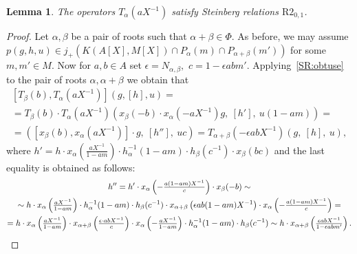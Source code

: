 \documentclass[oneside, 8pt]{amsart}
\newtheorem{lemma}{Lemma}
\theoremstyle{remark}
\theoremstyle{definition}
\numberwithin{lemma}{section}
\numberwithin{prop}{section}
\numberwithin{corollary}{section}
\numberwithin{externaltheorem}{section}
\numberwithin{equation}{section}
\begin{document}
\begin{lemma} \label{R2_0_1} The operators $T_\alpha(aX^{-1})$ satisfy Steinberg relations $\mathrm{R2}_{0,1}$. \end{lemma}
\begin{proof} 
Let $\alpha, \beta$ be a pair of roots such that $\alpha + \beta \in \Phi$.
As before, we may assume $p(g, h, u) \in j_+(K(A[X], M[X]) \cap P_\alpha(m) \cap P_{\alpha + \beta}(m'))$ for some $m, m' \in M$.
Now for $a, b \in A$ set $\epsilon = N_{\alpha, \beta},$ $c = 1 - \epsilon abm'$.
Applying~\cref{SR:obtuse} to the pair of roots $\alpha, \alpha+\beta$ we obtain that 
\begin{multline} \nonumber
[T_\beta(b), T_\alpha(aX^{-1})] \left(g, [h], u \right) = \\
 = T_\beta(b) \cdot T_\alpha(aX^{-1}) \left(x_\beta(-b) \cdot x_\alpha (-a X^{-1}) g,\ [h'],\ u (1 - am) \right) = \\
 = \left([x_\beta(b), x_\alpha(aX^{-1})]\cdot g,\ [h''],\ u c\right) = T_{\alpha+\beta}(-\epsilon abX^{-1})(g,\ [h],\ u),\end{multline} 
 where $h' = h\cdot x_\alpha\left(\tfrac{a X^{-1}}{1-am}\right) \cdot h_{\alpha}^{-1}(1-am)\cdot h_{\beta}(c^{-1}) \cdot x_{\beta}(bc)$  
  and the last equality is obtained as follows:
 \begin{multline} \nonumber
 h'' = h' \cdot x_\alpha\left(-\tfrac{a(1 - am)X^{-1}}{c}\right) \cdot x_\beta(-b) \sim \\ \sim  h\cdot x_\alpha\left(\tfrac{a X^{-1}}{1-am}\right) \cdot h_{\alpha}^{-1}(1-am)\cdot h_{\beta}(c^{-1})\cdot x_{\alpha + \beta}\left(\epsilon ab(1-am)X^{-1}\right)\cdot x_\alpha\left(-\tfrac{a(1 - am)X^{-1}}{c}\right) = \\
 = h\cdot x_\alpha\left(\tfrac{a X^{-1}}{1-am}\right) \cdot x_{\alpha + \beta}\left(\tfrac{\epsilon \cdot abX^{-1}}{c}\right)\cdot x_\alpha\left(-\tfrac{aX^{-1}}{1 - am}\right) \cdot h_{\alpha}^{-1}(1-am)\cdot h_{\beta}(c^{-1}) \sim h\cdot x_{\alpha + \beta}\left(\tfrac{\epsilon   abX^{-1}}{1 - \epsilon a b m'}\right). \qedhere
\end{multline}
\end{proof}
\end{document}
